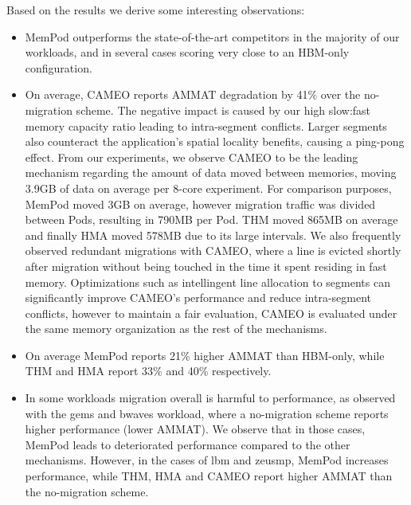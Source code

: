 Based on the results we derive some interesting observations:
\begin{itemize}[leftmargin=0.4cm]
\setlength\itemsep{0em}
	\item MemPod outperforms the state-of-the-art competitors in the majority of our workloads, and in several cases scoring very close to an HBM-only configuration. 
	\item On average, CAMEO reports AMMAT degradation by 41\% over the no-migration scheme. The negative impact is caused by our high slow:fast memory capacity ratio leading to intra-segment conflicts. Larger segments also counteract the application's spatial locality benefits, causing a ping-pong effect. From our experiments, we observe CAMEO to be the leading mechanism regarding the amount of data moved between memories, moving 3.9GB of data on average per 8-core experiment. For comparison purposes, MemPod moved 3GB on average, however migration traffic was divided between Pods, resulting in 790MB per Pod. THM moved 865MB on average and finally HMA moved 578MB due to its large intervals. We also frequently observed redundant migrations with CAMEO, where a line is evicted shortly after migration without being touched in the time it spent residing in fast memory. Optimizations such as intellingent line allocation to segments can significantly improve CAMEO's performance and reduce intra-segment conflicts, however to maintain a fair evaluation, CAMEO is evaluated under the same memory organization as the rest of the mechanisms.
	\item On average MemPod reports 21\% higher AMMAT than HBM-only, while THM and HMA report 33\% and 40\% respectively.
	
	\item In some workloads migration overall is harmful to performance, 
as observed with the gems and bwaves workload, where a no-migration scheme reports 
higher performance (lower AMMAT). We observe that in those cases, MemPod leads to deteriorated performance compared to the other mechanisms. However, in the cases of lbm and zeusmp, 
MemPod increases performance, while THM, HMA and CAMEO report higher AMMAT than the no-migration scheme.


\end{itemize}
